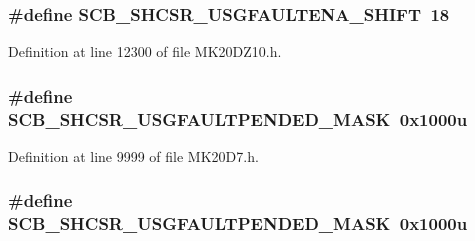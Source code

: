 \subsubsection[{\texorpdfstring{S\+C\+B\+\_\+\+S\+H\+C\+S\+R\+\_\+\+U\+S\+G\+F\+A\+U\+L\+T\+E\+N\+A\+\_\+\+S\+H\+I\+FT}{SCB_SHCSR_USGFAULTENA_SHIFT}}]{\setlength{\rightskip}{0pt plus 5cm}\#define S\+C\+B\+\_\+\+S\+H\+C\+S\+R\+\_\+\+U\+S\+G\+F\+A\+U\+L\+T\+E\+N\+A\+\_\+\+S\+H\+I\+FT~18}\hypertarget{group___s_c_b___register___masks_ga597bef62e8432e59ba7c7770bcdba356}{}\label{group___s_c_b___register___masks_ga597bef62e8432e59ba7c7770bcdba356}


Definition at line 12300 of file M\+K20\+D\+Z10.\+h.

\subsubsection[{\texorpdfstring{S\+C\+B\+\_\+\+S\+H\+C\+S\+R\+\_\+\+U\+S\+G\+F\+A\+U\+L\+T\+P\+E\+N\+D\+E\+D\+\_\+\+M\+A\+SK}{SCB_SHCSR_USGFAULTPENDED_MASK}}]{\setlength{\rightskip}{0pt plus 5cm}\#define S\+C\+B\+\_\+\+S\+H\+C\+S\+R\+\_\+\+U\+S\+G\+F\+A\+U\+L\+T\+P\+E\+N\+D\+E\+D\+\_\+\+M\+A\+SK~0x1000u}\hypertarget{group___s_c_b___register___masks_ga77527df58470c4d468aa1ce5d5ddb78a}{}\label{group___s_c_b___register___masks_ga77527df58470c4d468aa1ce5d5ddb78a}


Definition at line 9999 of file M\+K20\+D7.\+h.

\subsubsection[{\texorpdfstring{S\+C\+B\+\_\+\+S\+H\+C\+S\+R\+\_\+\+U\+S\+G\+F\+A\+U\+L\+T\+P\+E\+N\+D\+E\+D\+\_\+\+M\+A\+SK}{SCB_SHCSR_USGFAULTPENDED_MASK}}]{\setlength{\rightskip}{0pt plus 5cm}\#define S\+C\+B\+\_\+\+S\+H\+C\+S\+R\+\_\+\+U\+S\+G\+F\+A\+U\+L\+T\+P\+E\+N\+D\+E\+D\+\_\+\+M\+A\+SK~0x1000u}\hypertarget{group___s_c_b___register___masks_ga77527df58470c4d468aa1ce5d5ddb78a}{}\label{group___s_c_b___register___masks_ga77527df58470c4d468aa1ce5d5ddb78a}


